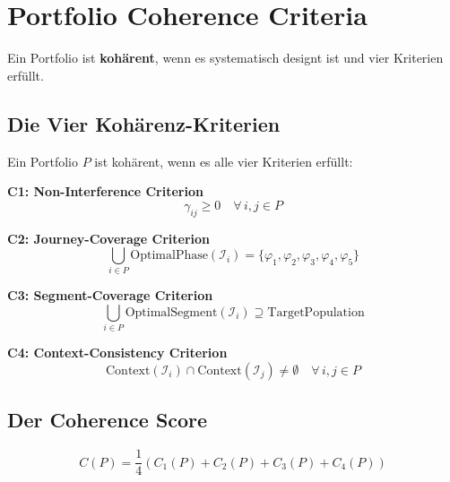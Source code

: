 \section{Portfolio Coherence Criteria}
\label{sec:20-coherence}

Ein Portfolio ist \textbf{kohärent}, wenn es systematisch designt ist und vier Kriterien erfüllt.

\subsection{Die Vier Kohärenz-Kriterien}

\begin{definition}
\label{def:20-coherence}
Ein Portfolio $P$ ist kohärent, wenn es alle vier Kriterien erfüllt:

\textbf{C1: Non-Interference Criterion}
\begin{equation}
\gamma_{ij} \geq 0 \quad \forall \, i, j \in P
\label{eq:20-c1}
\end{equation}

\textbf{C2: Journey-Coverage Criterion}
\begin{equation}
\bigcup_{i \in P} \text{OptimalPhase}(\mathcal{I}_i) = \{\varphi_1, \varphi_2, \varphi_3, \varphi_4, \varphi_5\}
\label{eq:20-c2}
\end{equation}

\textbf{C3: Segment-Coverage Criterion}
\begin{equation}
\bigcup_{i \in P} \text{OptimalSegment}(\mathcal{I}_i) \supseteq \text{TargetPopulation}
\label{eq:20-c3}
\end{equation}

\textbf{C4: Context-Consistency Criterion}
\begin{equation}
\text{Context}(\mathcal{I}_i) \cap \text{Context}(\mathcal{I}_j) \neq \emptyset \quad \forall \, i, j \in P
\label{eq:20-c4}
\end{equation}
\end{definition}

\subsection{Der Coherence Score}

\begin{equation}
C(P) = \frac{1}{4} \left( C_1(P) + C_2(P) + C_3(P) + C_4(P) \right)
\label{eq:20-coherence-score}
\end{equation}

